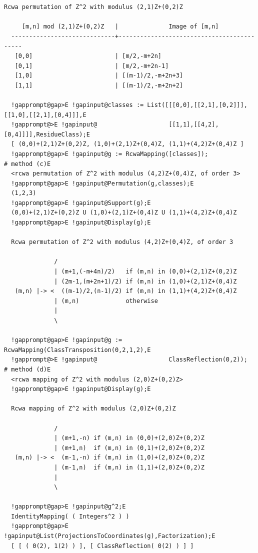 \documentclass[a4paper,11pt]{report}
\begin{document}
{{{\begin{Verbatim}[commandchars=!@E,fontsize=\small,frame=single,label=Example]
  Rcwa permutation of Z^2 with modulus (2,1)Z+(0,2)Z
  
     [m,n] mod (2,1)Z+(0,2)Z   |              Image of [m,n]
  -----------------------------+-------------------------------------------
   [0,0]                       | [m/2,-m+2n]
   [0,1]                       | [m/2,-m+2n-1]
   [1,0]                       | [(m-1)/2,-m+2n+3]
   [1,1]                       | [(m-1)/2,-m+2n+2]
  
  !gapprompt@gap>E !gapinput@classes := List([[[0,0],[[2,1],[0,2]]],[[1,0],[[2,1],[0,4]]],E
  !gapprompt@>E !gapinput@                    [[1,1],[[4,2],[0,4]]]],ResidueClass);E
  [ (0,0)+(2,1)Z+(0,2)Z, (1,0)+(2,1)Z+(0,4)Z, (1,1)+(4,2)Z+(0,4)Z ]
  !gapprompt@gap>E !gapinput@g := RcwaMapping([classes]);                             # method (c)E
  <rcwa permutation of Z^2 with modulus (4,2)Z+(0,4)Z, of order 3>
  !gapprompt@gap>E !gapinput@Permutation(g,classes);E
  (1,2,3)
  !gapprompt@gap>E !gapinput@Support(g);E
  (0,0)+(2,1)Z+(0,2)Z U (1,0)+(2,1)Z+(0,4)Z U (1,1)+(4,2)Z+(0,4)Z
  !gapprompt@gap>E !gapinput@Display(g);E
  
  Rcwa permutation of Z^2 with modulus (4,2)Z+(0,4)Z, of order 3
  
              /
              | (m+1,(-m+4n)/2)   if (m,n) in (0,0)+(2,1)Z+(0,2)Z
              | (2m-1,(m+2n+1)/2) if (m,n) in (1,0)+(2,1)Z+(0,4)Z
   (m,n) |-> <  ((m-1)/2,(n-1)/2) if (m,n) in (1,1)+(4,2)Z+(0,4)Z
              | (m,n)             otherwise
              |
              \
  
  !gapprompt@gap>E !gapinput@g := RcwaMapping(ClassTransposition(0,2,1,2),E
  !gapprompt@>E !gapinput@                    ClassReflection(0,2));                  # method (d)E
  <rcwa mapping of Z^2 with modulus (2,0)Z+(0,2)Z>
  !gapprompt@gap>E !gapinput@Display(g);E
  
  Rcwa mapping of Z^2 with modulus (2,0)Z+(0,2)Z
  
              /
              | (m+1,-n) if (m,n) in (0,0)+(2,0)Z+(0,2)Z
              | (m+1,n)  if (m,n) in (0,1)+(2,0)Z+(0,2)Z
   (m,n) |-> <  (m-1,-n) if (m,n) in (1,0)+(2,0)Z+(0,2)Z
              | (m-1,n)  if (m,n) in (1,1)+(2,0)Z+(0,2)Z
              |
              \
  
  !gapprompt@gap>E !gapinput@g^2;E
  IdentityMapping( ( Integers^2 ) )
  !gapprompt@gap>E !gapinput@List(ProjectionsToCoordinates(g),Factorization);E
  [ [ ( 0(2), 1(2) ) ], [ ClassReflection( 0(2) ) ] ]
  
\end{Verbatim}
 }

}}
\end{document}
